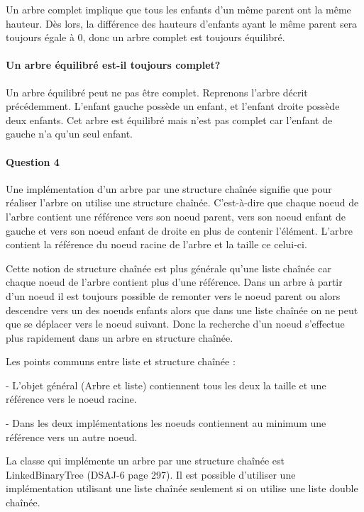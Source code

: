 \documentclass[a4paper]{article}
\begin{document}
Un arbre complet implique que tous les enfants d'un même parent ont la même hauteur. Dès lors, la différence des hauteurs d'enfants ayant le même parent sera toujours égale à 0, donc un arbre complet est toujours équilibré. \\

\paragraph{Un arbre équilibré est-il toujours complet?}


Un arbre équilibré peut ne pas être complet. Reprenons l'arbre décrit précédemment. L'enfant gauche possède un enfant, et l'enfant droite possède deux enfants. Cet arbre est équilibré mais n'est pas complet car l'enfant de gauche n'a qu'un seul enfant. 


\paragraph{Question 4}

Une implémentation d’un arbre par une structure chaînée signifie que pour réaliser l’arbre on utilise une structure chaînée. C’est-à-dire que chaque noeud de l’arbre contient une référence vers son noeud parent, vers son noeud enfant de gauche et vers son noeud enfant de droite en plus de contenir l’élément. L’arbre contient la référence du noeud racine de l’arbre et la taille ce celui-ci. 

Cette notion de structure chaînée est plus générale qu’une liste chaînée car chaque noeud de l’arbre contient plus d’une référence. Dans un arbre à partir d’un noeud il est toujours possible de remonter vers le noeud parent ou alors descendre vers un des noeuds enfants alors que dans une liste chaînée on ne peut que se déplacer vers le noeud suivant. Donc la recherche d’un noeud s’effectue plus rapidement dans un arbre en structure chaînée.

Les points communs entre liste et structure chaînée :

- L’objet général (Arbre et liste) contiennent tous les deux la taille et une référence vers le noeud racine.

- Dans les deux implémentations les noeuds contiennent au minimum une référence vers un autre noeud.

La classe qui implémente un arbre par une structure chaînée est LinkedBinaryTree (DSAJ-6 page 297). Il est possible d’utiliser une implémentation utilisant une liste chaînée seulement si on utilise une liste double chaînée.
\end{document}
